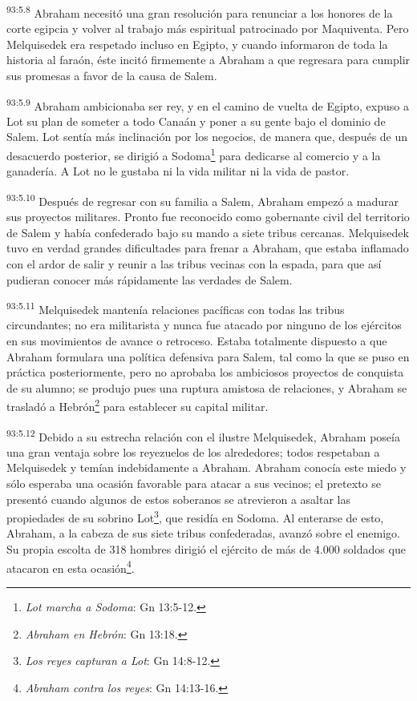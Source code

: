 \par
\textsuperscript{93:5.8} Abraham necesitó una gran resolución para renunciar a los honores de la corte egipcia y volver al trabajo más espiritual patrocinado por Maquiventa. Pero Melquisedek era respetado incluso en Egipto, y cuando informaron de toda la historia al faraón, éste incitó firmemente a Abraham a que regresara para cumplir sus promesas a favor de la causa de Salem.

\par
\textsuperscript{93:5.9} Abraham ambicionaba ser rey, y en el camino de vuelta de Egipto, expuso a Lot su plan de someter a todo Canaán y poner a su gente bajo el dominio de Salem. Lot sentía más inclinación por los negocios, de manera que, después de un desacuerdo posterior, se dirigió a Sodoma\footnote{\textit{Lot marcha a Sodoma}: Gn 13:5-12.} para dedicarse al comercio y a la ganadería. A Lot no le gustaba ni la vida militar ni la vida de pastor.

\par
\textsuperscript{93:5.10} Después de regresar con su familia a Salem, Abraham empezó a madurar sus proyectos militares. Pronto fue reconocido como gobernante civil del territorio de Salem y había confederado bajo su mando a siete tribus cercanas. Melquisedek tuvo en verdad grandes dificultades para frenar a Abraham, que estaba inflamado con el ardor de salir y reunir a las tribus vecinas con la espada, para que así pudieran conocer más rápidamente las verdades de Salem.

\par
\textsuperscript{93:5.11} Melquisedek mantenía relaciones pacíficas con todas las tribus circundantes; no era militarista y nunca fue atacado por ninguno de los ejércitos en sus movimientos de avance o retroceso. Estaba totalmente dispuesto a que Abraham formulara una política defensiva para Salem, tal como la que se puso en práctica posteriormente, pero no aprobaba los ambiciosos proyectos de conquista de su alumno; se produjo pues una ruptura amistosa de relaciones, y Abraham se trasladó a Hebrón\footnote{\textit{Abraham en Hebrón}: Gn 13:18.} para establecer su capital militar.

\par
\textsuperscript{93:5.12} Debido a su estrecha relación con el ilustre Melquisedek, Abraham poseía una gran ventaja sobre los reyezuelos de los alrededores; todos respetaban a Melquisedek y temían indebidamente a Abraham. Abraham conocía este miedo y sólo esperaba una ocasión favorable para atacar a sus vecinos; el pretexto se presentó cuando algunos de estos soberanos se atrevieron a asaltar las propiedades de su sobrino Lot\footnote{\textit{Los reyes capturan a Lot}: Gn 14:8-12.}, que residía en Sodoma. Al enterarse de esto, Abraham, a la cabeza de sus siete tribus confederadas, avanzó sobre el enemigo. Su propia escolta de 318 hombres dirigió el ejército de más de 4.000 soldados que atacaron en esta ocasión\footnote{\textit{Abraham contra los reyes}: Gn 14:13-16.}.

